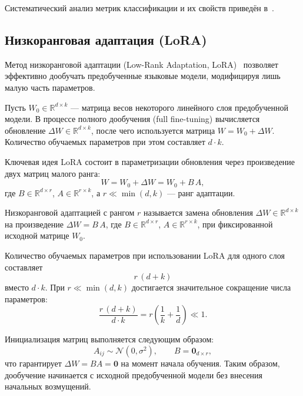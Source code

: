 Систематический анализ метрик классификации и их свойств приведён
в~\cite{sokolova2009systematic}.


\subsection{Низкоранговая адаптация (LoRA)}
\label{subsec:lora}

Метод низкоранговой адаптации (Low-Rank Adaptation, LoRA)~\cite{hu2022lora}
позволяет эффективно дообучать предобученные языковые модели, модифицируя лишь
малую часть параметров.

Пусть $W_0 \in \mathbb{R}^{d \times k}$ --- матрица весов некоторого
линейного слоя предобученной модели. В процессе полного дообучения
(full fine-tuning) вычисляется обновление $\Delta W \in \mathbb{R}^{d \times k}$,
после чего используется матрица $W = W_0 + \Delta W$.
Количество обучаемых параметров при этом составляет $d \cdot k$.

Ключевая идея LoRA состоит в параметризации обновления через произведение
двух матриц малого ранга:
\begin{equation}
    W = W_0 + \Delta W = W_0 + B\,A,
    \label{eq:lora-decomposition}
\end{equation}
где $B \in \mathbb{R}^{d \times r}$, $A \in \mathbb{R}^{r \times k}$,
а $r \ll \min(d, k)$ --- ранг адаптации.

\begin{definition}
\label{def:lora}
Низкоранговой адаптацией с рангом $r$ называется замена обновления
$\Delta W \in \mathbb{R}^{d \times k}$ на произведение
$\Delta W = B\,A$, где $B \in \mathbb{R}^{d \times r}$,
$A \in \mathbb{R}^{r \times k}$, при фиксированной исходной матрице $W_0$.
\end{definition}

Количество обучаемых параметров при использовании LoRA для одного слоя
составляет
\begin{equation}
    r\,(d + k)
    \label{eq:lora-params}
\end{equation}
вместо $d \cdot k$. При $r \ll \min(d, k)$ достигается значительное
сокращение числа параметров:
\begin{equation}
    \frac{r\,(d + k)}{d \cdot k}
    = r\left(\frac{1}{k} + \frac{1}{d}\right)
    \ll 1.
    \label{eq:lora-ratio}
\end{equation}

Инициализация матриц выполняется следующим образом:
\begin{equation}
    A_{ij} \sim \mathcal{N}(0, \sigma^2), \qquad B = \mathbf{0}_{d \times r},
    \label{eq:lora-init}
\end{equation}
что гарантирует $\Delta W = BA = \mathbf{0}$ на момент начала обучения.
Таким образом, дообучение начинается с исходной предобученной модели без
внесения начальных возмущений.

